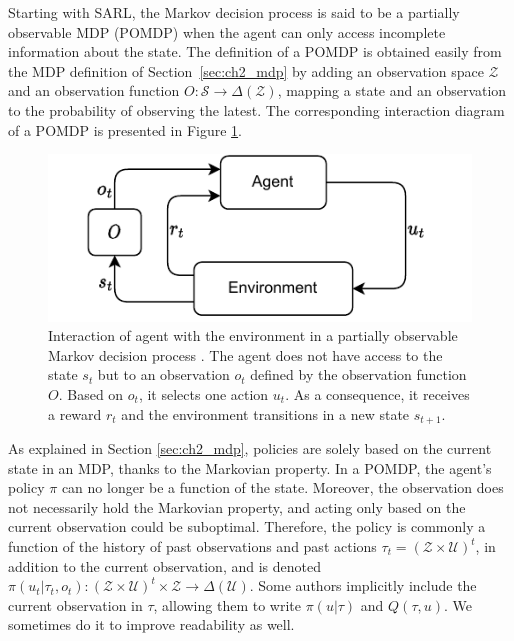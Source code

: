 Starting with SARL, the Markov decision process is said to be a partially observable MDP (POMDP) \citep{KAELBLING199899} when the agent can only access incomplete information about the state.
The definition of a POMDP is obtained easily from the MDP definition of Section~\ref{sec:ch2_mdp} by adding an observation space $\mathcal{Z}$ and an observation function $O:\mathcal{S} \rightarrow \Delta(\mathcal{Z})$, mapping a state and an observation to the probability of observing the latest.
The corresponding interaction diagram of a POMDP is presented in Figure \ref{fig:ch2_pomdp}.

\begin{figure}
    \centering
    \includegraphics[width=.8\linewidth]{tex_thesis/figures/ch2/POMDP.pdf}
    \caption{Interaction of agent with the environment in a partially observable Markov decision process \citep{KAELBLING199899}. The agent does not have access to the state $s_t$ but to an observation $o_t$ defined by the observation function $O$. Based on $o_t$, it selects one action $u_t$. As a consequence, it receives a reward $r_t$ and the environment transitions in a new state $s_{t+1}$.}
    \label{fig:ch2_pomdp}
\end{figure}

As explained in Section \ref{sec:ch2_mdp}, policies are solely based on the current state in an MDP, thanks to the Markovian property.
In a POMDP, the agent's policy $\pi$ can no longer be a function of the state.
Moreover, the observation does not necessarily hold the Markovian property, and acting only based on the current observation could be suboptimal.
Therefore, the policy is commonly a function of the history of past observations and past actions $\tau_t=(\mathcal{Z} \times \mathcal{U})^t$, in addition to the current observation, and is denoted $\pi(u_t|\tau_t,o_t): (\mathcal{Z} \times \mathcal{U})^t \times \mathcal{Z} \rightarrow \Delta(\mathcal{U})$.
Some authors implicitly include the current observation in $\tau$, allowing them to write $\pi(u|\tau)$ and $Q(\tau,u)$.
We sometimes do it to improve readability as well.


